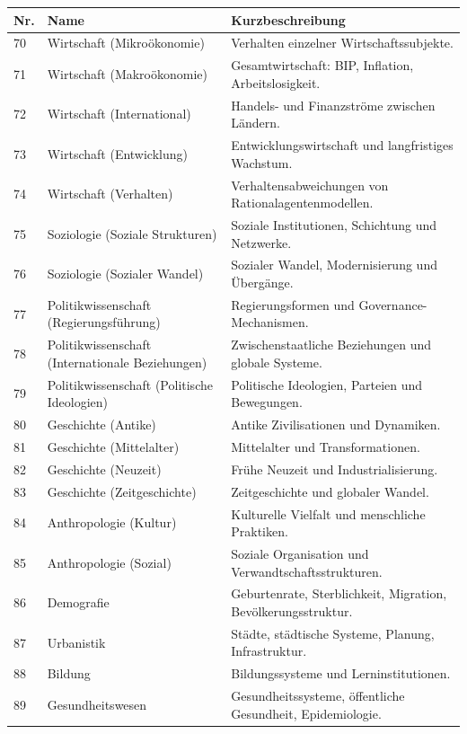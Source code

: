 \documentclass[13pt,a4paper]{article}
\begin{document}
	\begin{longtable}{|p{0.9cm}|p{6.0cm}|p{8.6cm}|}
		\hline
		\textbf{Nr.} & \textbf{Name} & \textbf{Kurzbeschreibung} \\
		\hline
		\endhead
		70 & Wirtschaft (Mikroökonomie) & Verhalten einzelner Wirtschaftssubjekte. \\
		\hline
		71 & Wirtschaft (Makroökonomie) & Gesamtwirtschaft: BIP, Inflation, Arbeitslosigkeit. \\
		\hline
		72 & Wirtschaft (International) & Handels- und Finanzströme zwischen Ländern. \\
		\hline
		73 & Wirtschaft (Entwicklung) & Entwicklungswirtschaft und langfristiges Wachstum. \\
		\hline
		74 & Wirtschaft (Verhalten) & Verhaltensabweichungen von Rationalagentenmodellen. \\
		\hline
		75 & Soziologie (Soziale Strukturen) & Soziale Institutionen, Schichtung und Netzwerke. \\
		\hline
		76 & Soziologie (Sozialer Wandel) & Sozialer Wandel, Modernisierung und Übergänge. \\
		\hline
		77 & Politikwissenschaft (Regierungsführung) & Regierungsformen und Governance-Mechanismen. \\
		\hline
		78 & Politikwissenschaft (Internationale Beziehungen) & Zwischenstaatliche Beziehungen und globale Systeme. \\
		\hline
		79 & Politikwissenschaft (Politische Ideologien) & Politische Ideologien, Parteien und Bewegungen. \\
		\hline
		80 & Geschichte (Antike) & Antike Zivilisationen und Dynamiken. \\
		\hline
		81 & Geschichte (Mittelalter) & Mittelalter und Transformationen. \\
		\hline
		82 & Geschichte (Neuzeit) & Frühe Neuzeit und Industrialisierung. \\
		\hline
		83 & Geschichte (Zeitgeschichte) & Zeitgeschichte und globaler Wandel. \\
		\hline
		84 & Anthropologie (Kultur) & Kulturelle Vielfalt und menschliche Praktiken. \\
		\hline
		85 & Anthropologie (Sozial) & Soziale Organisation und Verwandtschaftsstrukturen. \\
		\hline
		86 & Demografie & Geburtenrate, Sterblichkeit, Migration, Bevölkerungsstruktur. \\
		\hline
		87 & Urbanistik & Städte, städtische Systeme, Planung, Infrastruktur. \\
		\hline
		88 & Bildung & Bildungssysteme und Lerninstitutionen. \\
		\hline
		89 & Gesundheitswesen & Gesundheitssysteme, öffentliche Gesundheit, Epidemiologie. \\
		\hline
	\end{longtable}
	
\end{document}
